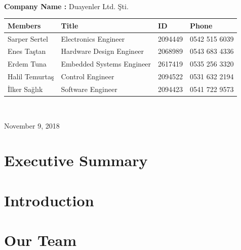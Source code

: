 \documentclass[a4paper,12pt]{article}
\begin{document}
\begin{titlepage}
\begin{minipage}[r]{0.35\textwidth}
\end{minipage}\\[1cm]
\begin{minipage}{\textwidth}
	\begin{flushleft}
		\large{\textbf{Company Name :}}	Duayenler Ltd. Şti.\\
		\begin{table}[H]
			\begin{tabular}{l l l l}
				\hline
				\textbf{Members}&\textbf{Title}& \textbf{ID}&\textbf{Phone} \\ \hline
				Sarper Sertel & Electronics Engineer& 2094449 & 0542 515 6039  \\ 
				Enes Taştan & Hardware Design Engineer & 2068989 & 0543 683 4336  \\ 
				Erdem Tuna & Embedded Systems Engineer& 2617419 & 0535 256 3320  \\ 
				Halil Temurtaş & Control Engineer& 2094522 & 0531 632 2194  \\
				İlker Sağlık & Software Engineer& 2094423 & 0541 722 9573  \\ \hline
				
				
			\end{tabular}
		\end{table}
	\end{flushleft}
\end{minipage}\\[1cm]

\begin{flushbottom}
{\large November 9, 2018} %
\end{flushbottom}

\end{titlepage}

\blankpage
\tableofcontents
\newpage


\section{Executive Summary}


\section{Introduction}

\section{Our Team}
\end{document}
